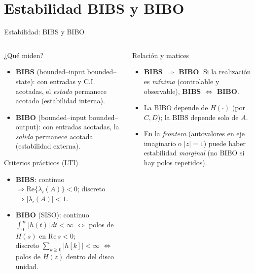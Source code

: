 \documentclass[
    10pt,
    aspectratio=169,
    xcolor={dvipsnames},
    spanish,
    ]{beamer}
\begin{document}
\section{Estabilidad BIBS y BIBO}
\begin{frame}{Estabilidad: BIBS y BIBO}
\footnotesize
\begin{columns}[T]
  \begin{column}{0.56\textwidth}
    \begin{block}{¿Qué miden?}
      \begin{itemize}\itemsep2pt
        \item \textbf{BIBS} (bounded–input bounded–state): con entradas y C.I. acotadas, el \emph{estado} permanece acotado (estabilidad interna).
        \item \textbf{BIBO} (bounded–input bounded–output): con entradas acotadas, la \emph{salida} permanece acotada (estabilidad externa).
      \end{itemize}
    \end{block}
    \begin{block}{Criterios prácticos (LTI)}
      \begin{itemize}\itemsep2pt
        \item \textbf{BIBS}: continuo $\Rightarrow \mathrm{Re}\{\lambda_i(A)\}<0$;\; discreto $\Rightarrow |\lambda_i(A)|<1$.
        \item \textbf{BIBO} (SISO): continuo $\int_0^{\infty}|h(t)|\,dt<\infty$ $\Leftrightarrow$ polos de $H(s)$ en $\mathrm{Re}\,s<0$;\\
        discreto $\sum_{k\ge 0}|h[k]|<\infty$ $\Leftrightarrow$ polos de $H(z)$ dentro del disco unidad.
      \end{itemize}
    \end{block}
  \end{column}
  \begin{column}{0.42\textwidth}
    \begin{block}{Relación y matices}
      \begin{itemize}\itemsep2pt
        \item \textbf{BIBS $\Rightarrow$ BIBO}. Si la realización es \emph{mínima} (controlable y observable), \textbf{BIBS $\Leftrightarrow$ BIBO}.
        \item La BIBO depende de $H(\cdot)$ (por $C,D$); la BIBS depende solo de $A$.
        \item En la \emph{frontera} (autovalores en eje imaginario o $|z|{=}1$) puede haber estabilidad \emph{marginal} (no BIBO si hay polos repetidos).
      \end{itemize}
    \end{block}
  \end{column}
\end{columns}
\end{frame}
\end{document}
